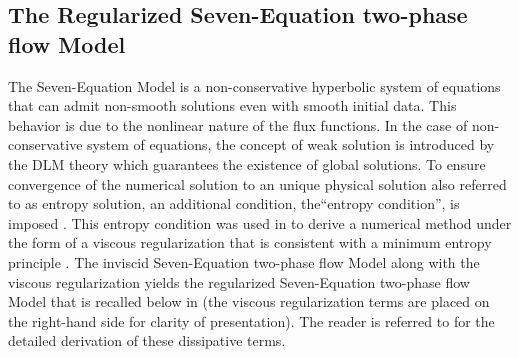 \documentclass[preprint,10pt]{elsarticle}
\begin{document}
\subsection{The Regularized Seven-Equation two-phase flow Model}\label{sec:ref-sem}
%
The Seven-Equation Model is a non-conservative hyperbolic system of equations that can admit non-smooth solutions even with smooth initial data. This 
behavior is due to the nonlinear nature of the flux functions. In the case of non-conservative system of equations, the concept of weak solution is introduced by the DLM theory \cite{dlm}
which guarantees the existence of global solutions. To ensure convergence of the numerical solution to an unique physical solution also referred to as entropy solution, an additional condition, 
the``entropy condition'', is imposed \cite{lefloch_1988}.  This entropy condition was used 
in \cite{Marco_paper_sem} to derive a numerical method under the form of a viscous regularization that is consistent with a minimum entropy principle . 
The inviscid Seven-Equation two-phase flow Model along with the viscous 
regularization yields the regularized Seven-Equation two-phase flow Model that is recalled below in  
(the viscous regularization terms are placed on the right-hand side for clarity of presentation). The reader 
is referred to \cite{Marco_paper_sem} for the detailed derivation of these dissipative terms.
%
\end{document}
